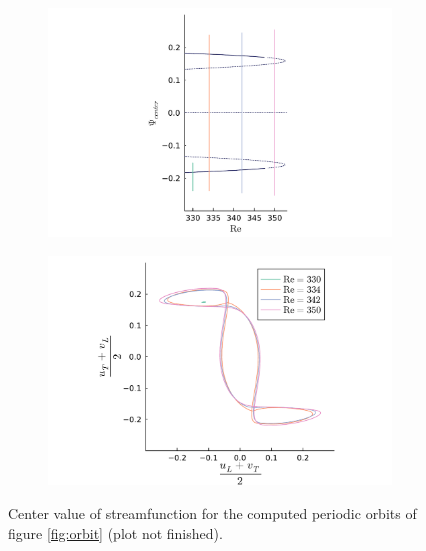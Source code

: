 \begin{figure}[ht]
  \begin{subfigure}[b]{0.42\textwidth}
  \centering
  \includegraphics[trim={3cm 0 4.6cm 0},clip,width=\textwidth]{figs/orbits_bif_diag32x32.pdf}
  \end{subfigure}
  \begin{subfigure}[b]{0.58\textwidth}
  \centering
  \includegraphics[trim={1cm 0cm 1cm 0cm},clip,width=\textwidth]{figs/orbits32x32.pdf}
  \end{subfigure}
  \caption{Center value of streamfunction for the computed periodic orbits of figure \ref{fig:orbit}
  (plot not finished).} 
  \label{fig:orbit_bif_diag}
\end{figure}

